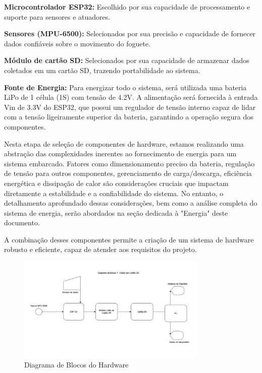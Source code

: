 \textbf{Microcontrolador ESP32:} Escolhido por sua capacidade de processamento e suporte para sensores e atuadores.

\textbf{Sensores (MPU-6500):} Selecionados por sua precisão e capacidade de fornecer dados confiáveis sobre o movimento do foguete.

\textbf{Módulo de cartão SD:} Selecionados por sua capacidade de armazenar dados coletados em um cartão SD, trazendo portabilidade ao sistema.

\textbf{Fonte de Energia:} Para energizar todo o sistema, será utilizada uma bateria LiPo de 1 célula (1S) com tensão de 4.2V. A alimentação será fornecida à entrada Vin de 3.3V do ESP32, que possui um regulador de tensão interno capaz de lidar com a tensão ligeiramente superior da bateria, garantindo a operação segura dos componentes.

Nesta etapa de seleção de componentes de hardware, estamos realizando uma abstração das complexidades inerentes ao fornecimento de energia para um sistema embarcado. Fatores como dimensionamento preciso da bateria, regulação de tensão para outros componentes, gerenciamento de carga/descarga, eficiência energética e dissipação de calor são considerações cruciais que impactam diretamente a estabilidade e a confiabilidade do sistema. No entanto, o detalhamento aprofundado dessas considerações, bem como a análise completa do sistema de energia, serão abordados na seção dedicada à "Energia" deste documento.

A combinação desses componentes permite a criação de um sistema de hardware robusto e eficiente, capaz de atender aos requisitos do projeto.


\begin{figure}[h!]
    \centering
    \includegraphics[width=0.8\textwidth]{figuras/diagramaDeBlocosHardware.png}

    \caption{Diagrama de Blocos do Hardware}
    \label{fig_diagrama_blocos_hardware}
\end{figure}

